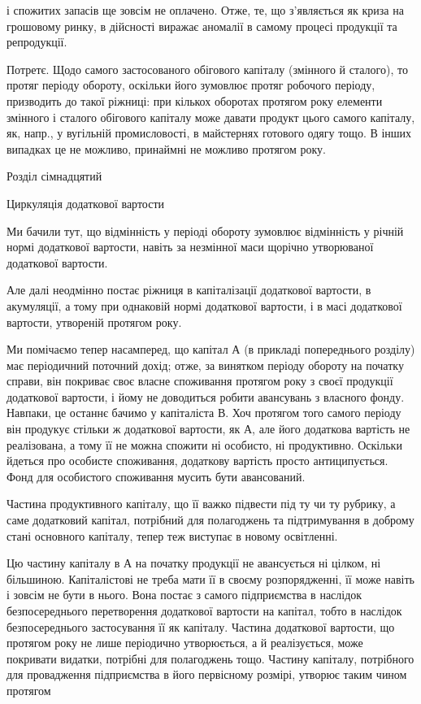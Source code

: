 і спожитих запасів ще зовсім не оплачено. Отже, те, що з’являється
як криза на грошовому ринку, в дійсності виражає аномалії в самому процесі
продукції та репродукції.

Потретє. Щодо самого застосованого обігового капіталу (змінного
й сталого), то протяг періоду обороту, оскільки його зумовлює протяг
робочого періоду, призводить до такої ріжниці: при кількох оборотах
протягом року елементи змінного і сталого обігового капіталу може
давати продукт цього самого капіталу, як, напр., у вугільній промисловості,
в майстернях готового одягу тощо. В інших випадках це не можливо,
принаймні не можливо протягом року.

Розділ сімнадцятий

Циркуляція додаткової вартости

Ми бачили тут, що відмінність у періоді обороту зумовлює відмінність
у річній нормі додаткової вартости, навіть за незмінної маси щорічно
утворюваної додаткової вартости.

Але далі неодмінно постає ріжниця в капіталізації додаткової вартости,
в акумуляції, а тому при однаковій нормі додаткової вартости,
і в масі додаткової вартости, утвореній протягом року.

Ми помічаємо тепер насамперед, що капітал А (в прикладі попереднього
розділу) має періодичний поточний дохід; отже, за винятком періоду
обороту на початку справи, він покриває своє власне споживання
протягом року з своєї продукції додаткової вартости, і йому не доводиться
робити авансувань з власного фонду. Навпаки, це останнє
бачимо у капіталіста В. Хоч протягом того самого періоду він продукує
стільки ж додаткової вартости, як А, але його додаткова вартість не
реалізована, а тому її не можна спожити ні особисто, ні продуктивно. Оскільки
йдеться про особисте споживання, додаткову вартість просто антиципується.
Фонд для особистого споживання мусить бути авансований.

Частина продуктивного капіталу, що її важко підвести під ту чи ту
рубрику, а саме додатковий капітал, потрібний для полагоджень та підтримування
в доброму стані основного капіталу, тепер теж виступає в
новому освітленні.

Цю частину капіталу в А на початку продукції не авансується ні
цілком, ні більшиною. Капіталістові не треба мати її в своєму розпорядженні,
її може навіть і зовсім не бути в нього. Вона постає з самого
підприємства в наслідок безпосереднього перетворення додаткової вартости
на капітал, тобто в наслідок безпосереднього застосування її як капіталу.
Частина додаткової вартости, що протягом року не лише періодично
утворюється, а й реалізується, може покривати видатки, потрібні для
полагоджень тощо. Частину капіталу, потрібного для провадження підприємства
в його первісному розмірі, утворює таким чином протягом
